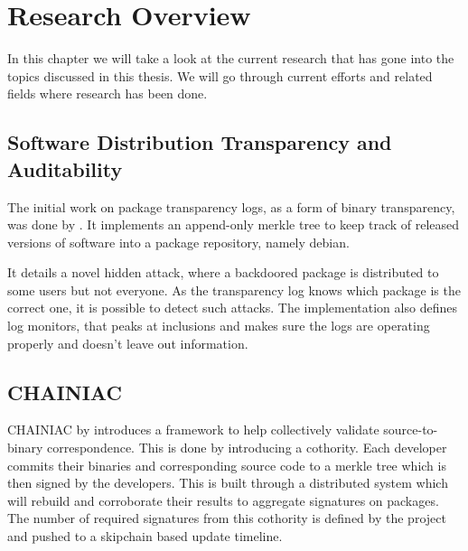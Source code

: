\documentclass[../Main/thesis.tex]{subfiles}
\begin{document}
\chapter{Research Overview}\label{ch:research_overview}
In this chapter we will take a look at the current research that has gone into
the topics discussed in this thesis. We will go through current efforts and
related fields where research has been done.


\section{Software Distribution Transparency and Auditability}\label{sec:benjamin}
The initial work on package transparency logs, as a form of binary transparency,
was done by \citeauthor{1711.07278v1}. It implements an append-only merkle tree to
keep track of released versions of software into a package repository, namely
debian.\cite{1711.07278v1}

It details a novel hidden attack, where a backdoored package is distributed to
some users but not everyone. As the transparency log knows which package is the
correct one, it is possible to detect such attacks. The implementation also
defines log monitors, that peaks at inclusions and makes sure the logs are
operating properly and doesn't leave out information.


\section{CHAINIAC}\label{sec:chainiac}
CHAINIAC by \citeauthor*{kirill-niktin-2017} introduces a framework to help
collectively validate source-to-binary correspondence\cite{kirill-niktin-2017}.
This is done by introducing a cothority. Each developer commits their binaries
and corresponding source code to a merkle tree which is then signed by the
developers. This is built through a distributed system which will rebuild and
corroborate their results to aggregate signatures on packages. The number of
required signatures from this cothority is defined by the project and pushed to
a skipchain based update timeline.
\end{document}
